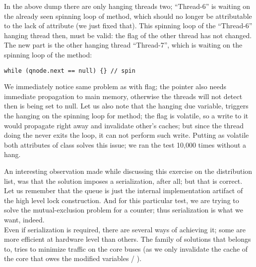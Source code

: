In the above dump there are only hanging threads two; ``Thread-6'' is
waiting on the already seen spinning loop of  method, which should no
longer be attributable to the lack of  attribute (we just
fixed that). This spinning loop of the ``Thread-6'' hanging thread
then, must be valid: the  flag of the other thread has not
changed. \\

The new part is the other hanging thread ``Thread-7'', which is
waiting on the spinning loop of the  method: \\

\begin{lstlisting}[style=numbers]
      while (qnode.next == null) {} // spin
\end{lstlisting}
\hfill

We immediately notice same problem as with  flag; the
 pointer also needs immediate propagation to main memory,
otherwise the threads will not detect then is being set to
null. Let us also note that the hanging due  variable,
triggers the hanging on the spinning loop for  method; the
 flag is volatile, so a write to it would propagate right
away and invalidate other's caches; but since the thread doing the
 never exits the loop, it can not perform such
write. Putting as volatile both attributes of class  solves
this issue; we ran  the test 10,000 times without a hang. 

An interesting observation made while discussing this exercise on the
distribution list, was that the solution imposes a serialization,
after all; but that is correct. Let us remember that the queue is just
the internal implementation artifact of the high level lock
construction. And for this particular test, we are trying to solve the
mutual-exclusion problem for a counter; thus serialization is what we
want, indeed. \\

Even if serialization is required, there are several ways of achieving
it; some are more efficient at hardware level than others. The family
of solutions that  belongs to, tries to minimize traffic on
the core buses (as we only invalidate the cache of the core that owes
the modified variables  / ).


